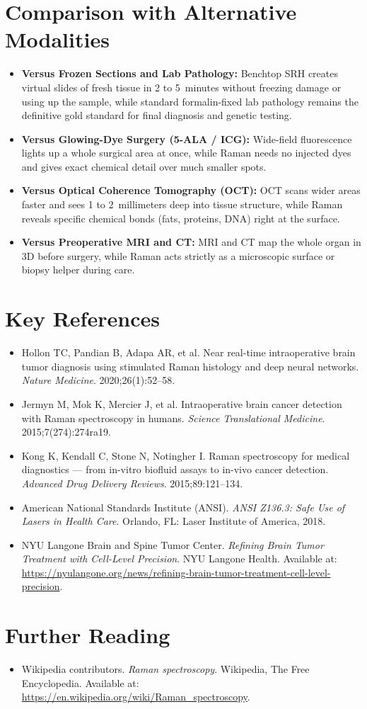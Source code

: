 \section{Comparison with Alternative Modalities}
\begin{itemize}
  \item \textbf{Versus Frozen Sections and Lab Pathology:} Benchtop SRH creates virtual slides of fresh tissue in 2 to 5~minutes without freezing damage or using up the sample, while standard formalin-fixed lab pathology remains the definitive gold standard for final diagnosis and genetic testing.
  \item \textbf{Versus Glowing-Dye Surgery (5-ALA / ICG):} Wide-field fluorescence lights up a whole surgical area at once, while Raman needs no injected dyes and gives exact chemical detail over much smaller spots.
  \item \textbf{Versus Optical Coherence Tomography (OCT):} OCT scans wider areas faster and sees 1 to 2~millimeters deep into tissue structure, while Raman reveals specific chemical bonds (fats, proteins, DNA) right at the surface.
  \item \textbf{Versus Preoperative MRI and CT:} MRI and CT map the whole organ in 3D before surgery, while Raman acts strictly as a microscopic surface or biopsy helper during care.
\end{itemize}

\section{Key References}
\begin{itemize}
  \item Hollon TC, Pandian B, Adapa AR, et al. Near real-time intraoperative brain tumor diagnosis using stimulated Raman histology and deep neural networks. \textit{Nature Medicine}. 2020;26(1):52--58.
  \item Jermyn M, Mok K, Mercier J, et al. Intraoperative brain cancer detection with Raman spectroscopy in humans. \textit{Science Translational Medicine}. 2015;7(274):274ra19.
  \item Kong K, Kendall C, Stone N, Notingher I. Raman spectroscopy for medical diagnostics --- from in-vitro biofluid assays to in-vivo cancer detection. \textit{Advanced Drug Delivery Reviews}. 2015;89:121--134.
  \item American National Standards Institute (ANSI). \textit{ANSI Z136.3: Safe Use of Lasers in Health Care}. Orlando, FL: Laser Institute of America, 2018.
  \item NYU Langone Brain and Spine Tumor Center. \textit{Refining Brain Tumor Treatment with Cell-Level Precision}. NYU Langone Health. Available at: \url{https://nyulangone.org/news/refining-brain-tumor-treatment-cell-level-precision}.
\end{itemize}

\section{Further Reading}
\begin{itemize}
  \item Wikipedia contributors. \textit{Raman spectroscopy}. Wikipedia, The Free Encyclopedia. Available at: \url{https://en.wikipedia.org/wiki/Raman_spectroscopy}.
\end{itemize}
